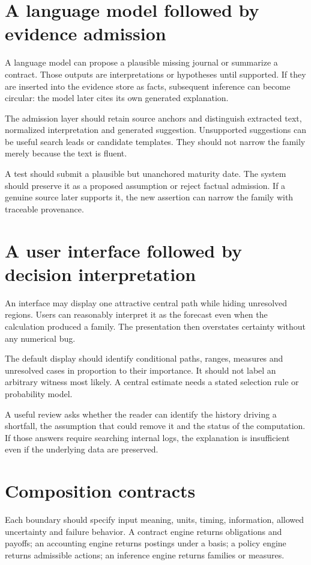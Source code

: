 \section{A language model followed by evidence admission}
A language model can propose a plausible missing journal or summarize a contract. Those outputs are interpretations or hypotheses until supported. If they are inserted into the evidence store as facts, subsequent inference can become circular: the model later cites its own generated explanation.

The admission layer should retain source anchors and distinguish extracted text, normalized interpretation and generated suggestion. Unsupported suggestions can be useful search leads or candidate templates. They should not narrow the family merely because the text is fluent.

A test should submit a plausible but unanchored maturity date. The system should preserve it as a proposed assumption or reject factual admission. If a genuine source later supports it, the new assertion can narrow the family with traceable provenance.

\section{A user interface followed by decision interpretation}
An interface may display one attractive central path while hiding unresolved regions. Users can reasonably interpret it as the forecast even when the calculation produced a family. The presentation then overstates certainty without any numerical bug.

The default display should identify conditional paths, ranges, measures and unresolved cases in proportion to their importance. It should not label an arbitrary witness most likely. A central estimate needs a stated selection rule or probability model.

A useful review asks whether the reader can identify the history driving a shortfall, the assumption that could remove it and the status of the computation. If those answers require searching internal logs, the explanation is insufficient even if the underlying data are preserved.

\section{Composition contracts}
Each boundary should specify input meaning, units, timing, information, allowed uncertainty and failure behavior. A contract engine returns obligations and payoffs; an accounting engine returns postings under a basis; a policy engine returns admissible actions; an inference engine returns families or measures.

